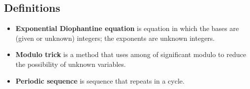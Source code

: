 \documentclass[12pt]{article}
\begin{document}
\subsection*{Definitions}
\begin{itemize}
    \item[-] \textbf{Exponential Diophantine equation} is equation in which the bases are (given or unknown) integers; the exponents are unknown integers.  
    \item[-] \textbf{Modulo trick} is a method that uses among of significant modulo to reduce the possibility of unknown variables.
    \item[-] \textbf{Periodic sequence} is sequence that repeats in a cycle.
\end{itemize}
\end{document}
